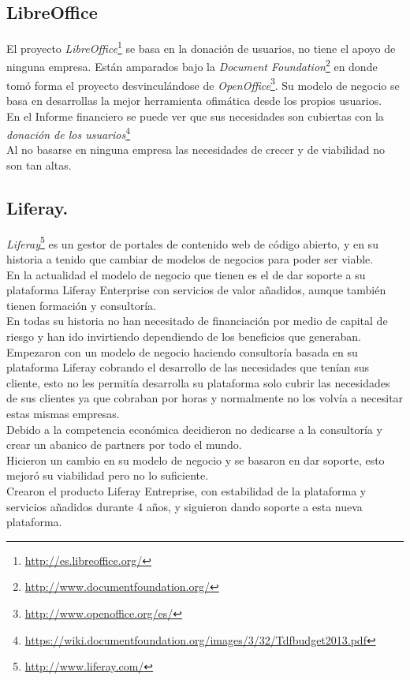 \documentclass[12pt]{article} %
\begin{document}
\subsection{LibreOffice} %

El proyecto \emph{LibreOffice}\footnote{\url{http://es.libreoffice.org/}} se basa en la donación de usuarios, no tiene el apoyo de ninguna empresa. Están amparados bajo la \emph{Document Foundation}\footnote{\url{http://www.documentfoundation.org/}} en donde tomó forma el proyecto desvinculándose de \emph{OpenOffice}\footnote{\url{http://www.openoffice.org/es/}}. Su modelo de negocio se basa en desarrollas la mejor herramienta ofimática desde los propios usuarios. \\En el Informe financiero se puede ver que sus necesidades son cubiertas con la \emph{donación de los usuarios}\footnote{\url{https://wiki.documentfoundation.org/images/3/32/Tdfbudget2013.pdf}}\\Al no basarse en ninguna empresa las necesidades de crecer y de viabilidad no son tan altas. 


\subsection{Liferay.} %

\emph{Liferay}\footnote{\url{http://www.liferay.com/}} es un gestor de portales de contenido web de código abierto, y en su historia a tenido que cambiar de modelos de negocios para poder ser viable.\\En la actualidad el modelo de negocio que tienen es el de dar soporte a su plataforma Liferay Enterprise con servicios de valor añadidos, aunque también tienen formación y consultoría.\\En todas su historia no han necesitado de financiación por medio de capital de riesgo y han ido invirtiendo dependiendo de los beneficios que generaban.\\Empezaron con un modelo de negocio haciendo consultoría basada en su plataforma Liferay cobrando el desarrollo de las necesidades que tenían sus cliente, esto no les permitía desarrolla su plataforma solo cubrir las necesidades de sus clientes ya que cobraban por horas y normalmente no los volvía a necesitar estas mismas empresas.\\ Debido a la competencia económica decidieron no dedicarse a la consultoría y crear un abanico de partners por todo el mundo.\\Hicieron un cambio en su modelo de negocio y se basaron en dar soporte, esto mejoró su viabilidad pero no lo suficiente.
\\Crearon el producto Liferay Entreprise, con estabilidad de la plataforma y servicios añadidos durante 4 años, y siguieron dando soporte a esta nueva plataforma.
\end{document}
